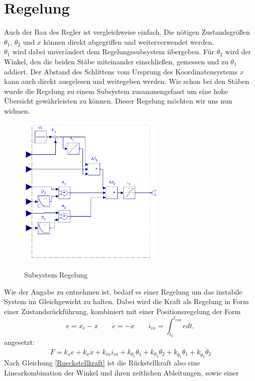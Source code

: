 \documentclass[a4paper, 10pt]{report}
\begin{document}
\section{Regelung}
Auch der Bau des Regler ist vergleichweise einfach. Die nötigen Zustandsgrößen $\theta_{1}$, $\theta_{2}$ und $x$ können direkt abgegriffen und weiterverwendet werden. \\
$\theta_{1}$ wird dabei unverändert dem Regelungssubsystem übergeben. Für $\theta_{2}$ wird der Winkel, den die beiden Stäbe miteinander einschließen, gemessen und zu $\theta_{1}$ addiert. Der Abstand des Schlittens vom Ursprung des Koordinatensystems $x$ kann auch direkt ausgelesen und weitegeben werden. 
Wie schon bei den Stäben wurde die Regelung zu einem Subsystem zusammengefasst um eine hohe Übersicht gewährleisten zu können. Dieser Regelung möchten wir uns nun widmen. \newpage
\begin{figure}
\centering  %
\label{SubsystemRegelung}
{\includegraphics[width=7cm]{MapleSimRegelungCut}}
\caption{Subsystem Regelung}
\end{figure}
\noindent
Wie der Angabe zu entnehmen ist, bedarf es einer Regelung um das instabile System im Gleichgewicht zu halten. Dabei wird die Kraft als Regelung in Form einer Zustandsrückführung, kombiniert mit einer Positionsregelung der Form
\begin{equation}
\label{Auslenkungen}
e = x_{e} - x \qquad \dot{e} = - \dot{x} \qquad i_{in} = \int_{t_{0}}^{t_{end}} e  dt,
\end{equation}
angesetzt:
\begin{equation}
\label{Rueckstellkraft}
F = k_{x}e + k_{\dot{x}}\dot{x} + k_{in}i_{in} + k_{\theta_{1}}\theta_{1} + k_{\theta_{2}}\theta_{2} + k_{\dot{\theta}_{1}}\dot{\theta}_{1} + k_{\dot{\theta}_{2}}\dot{\theta}_{2}
\end{equation}
Nach Gleichung \ref{Rueckstellkraft} ist die Rückstellkraft also eine Linearkombination der Winkel und ihren zeitlichen Ableitungen, sowie einer
\end{document}
